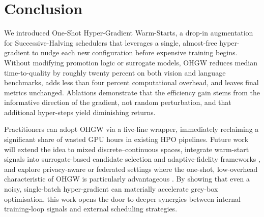 \documentclass{article}
\begin{document}
\section{Conclusion}
We introduced One-Shot Hyper-Gradient Warm-Starts, a drop-in augmentation for Successive-Halving schedulers that leverages a single, almost-free hyper-gradient to nudge each new configuration before expensive training begins. Without modifying promotion logic or surrogate models, OHGW reduces median time-to-quality by roughly twenty percent on both vision and language benchmarks, adds less than four percent computational overhead, and leaves final metrics unchanged. Ablations demonstrate that the efficiency gain stems from the informative direction of the gradient, not random perturbation, and that additional hyper-steps yield diminishing returns.

Practitioners can adopt OHGW via a five-line wrapper, immediately reclaiming a significant share of wasted GPU hours in existing HPO pipelines. Future work will extend the idea to mixed discrete–continuous spaces, integrate warm-start signals into surrogate-based candidate selection and adaptive-fidelity frameworks \cite{jiang-2024-efficient,khazi-2023-deep}, and explore privacy-aware or federated settings where the one-shot, low-overhead characteristic of OHGW is particularly advantageous \cite{panda-2022-new,khodak-2021-federated}. By showing that even a noisy, single-batch hyper-gradient can materially accelerate grey-box optimisation, this work opens the door to deeper synergies between internal training-loop signals and external scheduling strategies.



\end{document}
